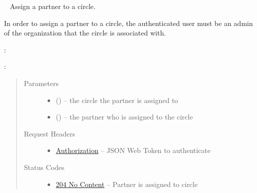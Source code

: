 \documentclass[letterpaper,10pt,english]{sphinxmanual}
\begin{document}
\begin{fulllineitems}
\label{\detokenize{resources/circle:put--circles-(circle_id)-members-(partner_id)}}~
Assign a partner to a circle.

In order to assign a partner to a circle, the authenticated user must
be an admin of the organization that the circle is associated with.

:

\begin{sphinxVerbatim}[commandchars=\\\{\}]
  
 
 
\end{sphinxVerbatim}

:

\begin{sphinxVerbatim}[commandchars=\\\{\}]
  
\end{sphinxVerbatim}
\begin{quote}\begin{description}
\item[{Parameters}] \leavevmode\begin{itemize}
\item {} 
 () -- the circle the partner is assigned to

\item {} 
 () -- the partner who is assigned to the circle

\end{itemize}

\item[{Request Headers}] \leavevmode\begin{itemize}
\item {} 
\href{http://tools.ietf.org/html/rfc7235\#section-4.2}{Authorization} -- JSON Web Token to authenticate

\end{itemize}

\item[{Status Codes}] \leavevmode\begin{itemize}
\item {} 
\href{http://www.w3.org/Protocols/rfc2616/rfc2616-sec10.html\#sec10.2.5}{204 No Content} -- Partner is assigned to circle


\end{itemize}
\end{description}
\end{quote}
\end{fulllineitems}
\end{document}
